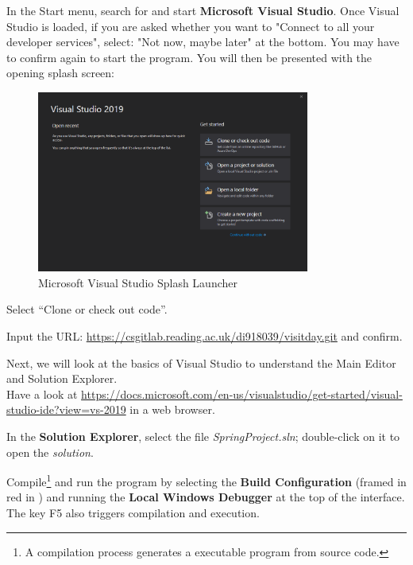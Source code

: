 \begin{steps}
  \item In the Start menu, search for and start \textbf{Microsoft Visual Studio}.
  Once Visual Studio is loaded, if you are asked whether you want to "Connect to all your developer services", select: "Not now, maybe later" at the bottom.
  You may have to confirm again to start the program.
  You will then be presented with the opening splash screen:

  \begin{figure}[H]
      \centering
      \includegraphics[width=0.8\textwidth]{img/splash.png}
      \caption{\label{splash} Microsoft Visual Studio Splash Launcher}
  \end{figure}

  \item Select “Clone or check out code”.
  \item Input the URL: \url{https://csgitlab.reading.ac.uk/di918039/visitday.git} and confirm.
  \item Next, we will look at the basics of Visual Studio to understand the Main Editor and Solution Explorer. \\
  Have a look at \url{https://docs.microsoft.com/en-us/visualstudio/get-started/visual-studio-ide?view=vs-2019} in a web browser.
  \item In the \textbf{Solution Explorer}, select the file {\small \textit{SpringProject.sln}}; double-click on it to open the \textit{solution}.
  \item Compile\footnote{A compilation process generates a executable program from source code.} and run the program by selecting the \textbf{Build Configuration} (framed in red in ) and running the \textbf{Local Windows Debugger} at the top of the interface. The key F5 also triggers compilation and execution.


\end{steps}
